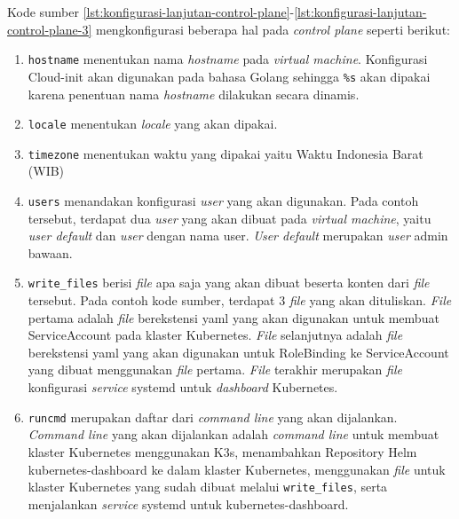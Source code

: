 Kode sumber \ref{lst:konfigurasi-lanjutan-control-plane}-\ref{lst:konfigurasi-lanjutan-control-plane-3}
mengkonfigurasi beberapa hal pada \emph{control plane} seperti berikut:

\begin{enumerate}
  
  \item \lstinline{hostname} menentukan nama \emph{hostname} pada \emph{virtual machine}.
    Konfigurasi Cloud-init akan digunakan pada bahasa Golang sehingga \lstinline{%s}
    akan dipakai karena penentuan nama \emph{hostname} dilakukan secara dinamis.

  \item \lstinline{locale} menentukan \emph{locale} yang akan dipakai.

  \item \lstinline{timezone} menentukan waktu yang dipakai yaitu Waktu Indonesia Barat (WIB)

  \item \lstinline{users} menandakan konfigurasi \emph{user} yang akan digunakan. Pada
    contoh tersebut, terdapat dua \emph{user} yang akan dibuat pada \emph{virtual machine},
    yaitu \emph{user default} dan \emph{user} dengan nama user. \emph{User default} merupakan
    \emph{user} admin bawaan.

  \item \lstinline{write_files} berisi \emph{file} apa saja yang akan dibuat beserta konten
    dari \emph{file} tersebut. Pada contoh kode sumber, terdapat 3 \emph{file} yang akan dituliskan.
    \emph{File} pertama adalah \emph{file} berekstensi yaml yang akan digunakan untuk membuat
    ServiceAccount pada klaster Kubernetes. \emph{File} selanjutnya adalah \emph{file} berekstensi
    yaml yang akan digunakan untuk RoleBinding ke ServiceAccount yang dibuat menggunakan
    \emph{file} pertama. \emph{File} terakhir merupakan \emph{file} konfigurasi 
    \emph{service} systemd untuk \emph{dashboard} Kubernetes.

  \item \lstinline{runcmd} merupakan daftar dari \emph{command line} yang akan dijalankan.
    \emph{Command line} yang akan dijalankan adalah \emph{command line} untuk membuat klaster
    Kubernetes menggunakan K3s, menambahkan Repository Helm kubernetes-dashboard ke dalam
    klaster Kubernetes, menggunakan \emph{file} untuk klaster Kubernetes yang sudah dibuat
    melalui \lstinline{write_files}, serta menjalankan \emph{service} systemd untuk
    kubernetes-dashboard.

\end{enumerate}


